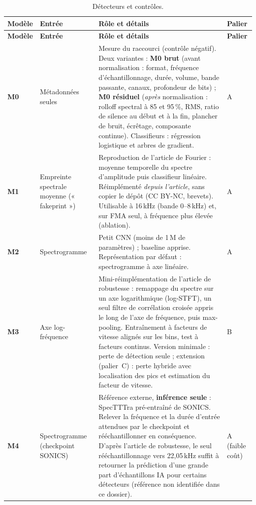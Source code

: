 \documentclass[11pt,a4paper]{article}
\begin{document}
{\small
\begin{longtable}{L{1.3cm}L{4.2cm}L{6.8cm}L{1.2cm}}
\caption{Détecteurs et contrôles.}\label{tab:detecteurs}\\
\toprule
\textbf{Modèle} & \textbf{Entrée} & \textbf{Rôle et détails} & \textbf{Palier}\\
\midrule
\endfirsthead
\toprule
\textbf{Modèle} & \textbf{Entrée} & \textbf{Rôle et détails} & \textbf{Palier}\\
\midrule
\endhead
\bottomrule
\endfoot
\textbf{M0} & Métadonnées seules & Mesure du raccourci (contrôle négatif). Deux variantes : \textbf{M0 brut} (avant normalisation : format, fréquence d'échantillonnage, durée, volume, bande passante, canaux, profondeur de bits) ; \textbf{M0 résiduel} (\emph{après} normalisation : rolloff spectral à 85 et 95\,\%, RMS, ratio de silence au début et à la fin, plancher de bruit, écrêtage, composante continue). Classifieurs : régression logistique et arbres de gradient. & A\\
\textbf{M1} & Empreinte spectrale moyenne (« fakeprint ») & Reproduction de l'article de Fourier : moyenne temporelle du spectre d'amplitude puis classifieur linéaire. Réimplémenté \emph{depuis l'article}, sans copier le dépôt (CC BY-NC, brevets). Utilisable à 16\,kHz (bande 0--8\,kHz) et, sur FMA seul, à fréquence plus élevée (ablation). & A\\
\textbf{M2} & Spectrogramme & Petit CNN (moins de 1\,M de paramètres) ; baseline apprise. Représentation par défaut : spectrogramme à axe linéaire. & A\\
\textbf{M3} & Axe log-fréquence & Mini-réimplémentation de l'article de robustesse : remappage du spectre sur un axe logarithmique (log-STFT), un seul filtre de corrélation croisée appris le long de l'axe de fréquence, puis max-pooling. Entraînement à facteurs de vitesse alignés sur les bins, test à facteurs continus. Version minimale : perte de détection seule ; extension (palier~C) : perte hybride avec localisation des pics et estimation du facteur de vitesse. & B\\
\textbf{M4} & Spectrogramme (checkpoint SONICS) & Référence externe, \textbf{inférence seule} : SpecTTTra pré-entraîné de SONICS. Relever la fréquence et la durée d'entrée attendues par le checkpoint et rééchantillonner en conséquence. D'après l'article de robustesse, le seul rééchantillonnage vers 22,05\,kHz suffit à retourner la prédiction d'une grande part d'échantillons IA pour certains détecteurs (référence non identifiée dans ce dossier). & A (faible coût)\\
\end{longtable}
}
\end{document}
